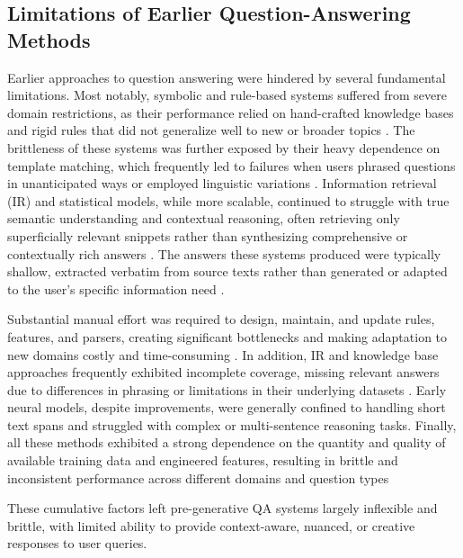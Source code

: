 \begin{spacing}{1.5}
\section{Limitations of Earlier Question-Answering Methods}
Earlier approaches to question answering were hindered by several fundamental limitations. Most notably, symbolic and rule-based systems suffered from severe domain restrictions, as their performance relied on hand-crafted knowledge bases and rigid rules that did not generalize well to new or broader topics \citep{alqifari_question_2019}. The brittleness of these systems was further exposed by their heavy dependence on template matching, which frequently led to failures when users phrased questions in unanticipated ways or employed linguistic variations \citep{hirschman_natural_2001}. Information retrieval (IR) and statistical models, while more scalable, continued to struggle with true semantic understanding and contextual reasoning, often retrieving only superficially relevant snippets rather than synthesizing comprehensive or contextually rich answers \citep{alanazi_question_2021, diefenbach_core_2018}. The answers these systems produced were typically shallow, extracted verbatim from source texts rather than generated or adapted to the user’s specific information need \citep{hirschman_natural_2001,alqifari_question_2019}.

Substantial manual effort was required to design, maintain, and update rules, features, and parsers, creating significant bottlenecks and making adaptation to new domains costly and time-consuming \citep{alanazi_question_2021}. In addition, IR and knowledge base approaches frequently exhibited incomplete coverage, missing relevant answers due to differences in phrasing or limitations in their underlying datasets \citep{diefenbach_core_2018}. Early neural models, despite improvements, were generally confined to handling short text spans and struggled with complex or multi-sentence reasoning tasks. Finally, all these methods exhibited a strong dependence on the quantity and quality of available training data and engineered features, resulting in brittle and inconsistent performance across different domains and question types \citep{alanazi_question_2021, alqifari_question_2019, diefenbach_core_2018, hirschman_natural_2001}

These cumulative factors left pre-generative QA systems largely inflexible and brittle, with limited ability to provide context-aware, nuanced, or creative responses to user queries.


\end{spacing}
